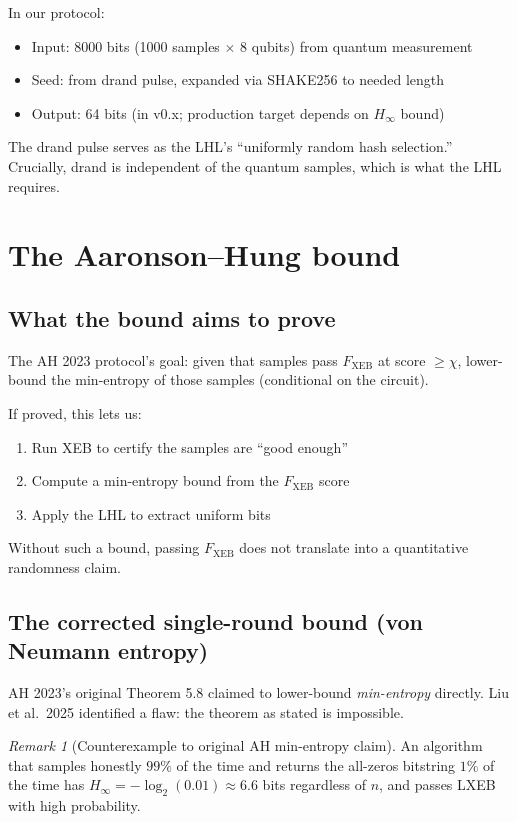 \documentclass[11pt,a4paper]{article}
\theoremstyle{plain}
\theoremstyle{definition}
\theoremstyle{remark}
\newtheorem*{remark}{Remark}
\newcommand{\Hmin}{H_{\infty}}
\begin{document}
In our protocol:
\begin{itemize}[itemsep=2pt,topsep=2pt]
  \item Input: 8000 bits (1000 samples $\times$ 8 qubits) from quantum measurement
  \item Seed: from drand pulse, expanded via SHAKE256 to needed length
  \item Output: 64 bits (in v0.x; production target depends on $\Hmin$ bound)
\end{itemize}

The drand pulse serves as the LHL's ``uniformly random hash selection.'' Crucially, drand is independent of the quantum samples, which is what the LHL requires.

\section{The Aaronson--Hung bound}
\label{sec:ah-bound}

\subsection{What the bound aims to prove}

The AH 2023 protocol's goal: given that samples pass $F_{\mathrm{XEB}}$ at score $\geq \chi$, lower-bound the min-entropy of those samples (conditional on the circuit).

If proved, this lets us:
\begin{enumerate}[itemsep=2pt,topsep=2pt]
  \item Run XEB to certify the samples are ``good enough''
  \item Compute a min-entropy bound from the $F_{\mathrm{XEB}}$ score
  \item Apply the LHL to extract uniform bits
\end{enumerate}
Without such a bound, passing $F_{\mathrm{XEB}}$ does not translate into a quantitative randomness claim.

\subsection{The corrected single-round bound (von Neumann entropy)}

AH 2023's original Theorem 5.8 claimed to lower-bound \emph{min-entropy} directly. Liu et al.\ 2025 identified a flaw: the theorem as stated is impossible.

\begin{remark}[Counterexample to original AH min-entropy claim]
An algorithm that samples honestly $99\%$ of the time and returns the all-zeros bitstring $1\%$ of the time has $\Hmin = -\log_2(0.01) \approx 6.6$ bits regardless of $n$, and passes LXEB with high probability.
\end{remark}
\end{document}
